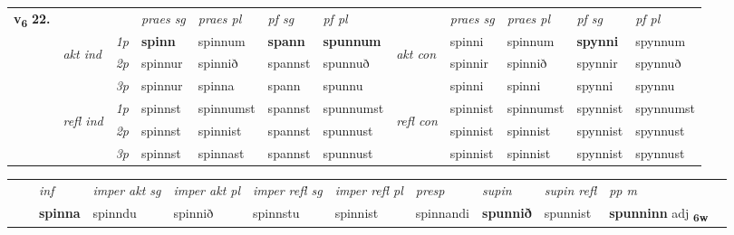 \begin{tabular}{llllllllllll} \toprule
\multirow{4}{*}{{{\textbf{v{\textsubscript{6}}} \Large{\textbf{22.}}}}}  & &   &  \textit{praes sg}  & \textit{praes pl}  &\textit{ pf sg} & \textit{pf pl} &  &  \textit{praes sg}  & \textit{praes pl}  & \textit{pf sg} & \textit{pf pl } \\*
	\cmidrule{4-7} \cmidrule{9-12}
 & \multirow{3}{*}{\begin{turn}{90}\textit{akt ind}\end{turn}} & {\textit{1p}} & \textbf{spinn} & spinnum    & \textbf{spann} & \textbf{spunnum} & \multirow{3}{*}{\begin{turn}{90}\textit{akt con}\end{turn}} &spinni & spinnum & \textbf{spynni} & spynnum\\*
& &  {\textit{2p}} &  spinnur  & spinnið   & spannst & spunnuð & & spinnir & spinnið & spynnir & spynnuð \\*
& &  {\textit{3p}} & spinnur & spinna   & spann & spunnu & & spinni & spinni& spynni & spynnu  \\*
\cmidrule{4-7} \cmidrule{9-12}
 &\multirow{3}{*}{\begin{turn}{90}\textit{refl ind}\end{turn}} & {\textit{1p}} & spinnst & spinnumst    & spannst & spunnumst & \multirow{3}{*}{\begin{turn}{90}\textit{refl con}\end{turn}}  &spinnist & spinnumst & spynnist & spynnumst\\*
 &&  {\textit{2p}} &  spinnst  & spinnist   & spannst & spunnust & &spinnist & spinnist & spynnist & spynnust \\*
& &  {\textit{3p}} & spinnst & spinnast   & spannst & spunnust & & spinnist & spinnist& spynnist & spynnust  \\*
\cmidrule{4-7} \cmidrule{9-12}
\end{tabular}


\begin{tabular}{llllllllllll}
 & & \textit{inf} & \textit{imper akt sg} & \textit{imper akt pl} & \textit{imper refl sg} & \textit{imper refl pl} & \textit{presp} & \textit{supin} & \textit{supin refl} & \textit{pp m}     \\*
  & & \textbf{spinna} & spinndu  & spinnið & spinnstu & spinnist & spinnandi &  \textbf{spunnið} & spunnist & \textbf{spunninn} adj \textbf{\textsubscript{6w}} \\*
\cmidrule{1-12}
\end{tabular}



